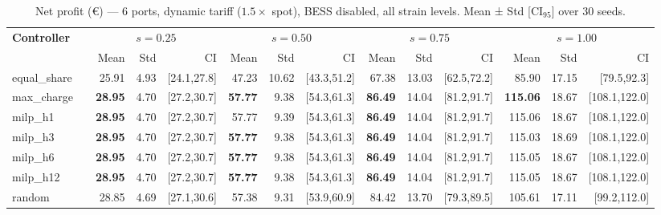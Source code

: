 \begin{table}[!htb]
\centering
\caption{Net profit (€) — 6 ports, dynamic tariff ($1.5\times$ spot),
         BESS disabled, all strain levels.
         Mean ± Std [CI$_{95}$] over 30 seeds.}
\label{tab:gc_dyn_nobess_6p}
\setlength{\tabcolsep}{3pt}
\begin{tabular}{lp{0.6cm} rrr rrr rrr rrr}
\toprule
\textbf{Controller} & &
  \multicolumn{3}{c}{$s=0.25$} &
  \multicolumn{3}{c}{$s=0.50$} &
  \multicolumn{3}{c}{$s=0.75$} &
  \multicolumn{3}{c}{$s=1.00$} \\
\cmidrule(lr){3-5}\cmidrule(lr){6-8}\cmidrule(lr){9-11}\cmidrule(lr){12-14}
 & & Mean & Std & CI & Mean & Std & CI & Mean & Std & CI & Mean & Std & CI \\
\midrule
equal\_share & & 25.91 &  4.93 & [24.1,27.8] & 47.23 & 10.62 & [43.3,51.2] & 67.38 & 13.03 & [62.5,72.2] &  85.90 & 17.15 & [79.5,92.3] \\
max\_charge  & & \textbf{28.95} &  4.70 & [27.2,30.7] & \textbf{57.77} &  9.38 & [54.3,61.3] & \textbf{86.49} & 14.04 & [81.2,91.7] & \textbf{115.06} & 18.67 & [108.1,122.0] \\
milp\_h1     & & \textbf{28.95} &  4.70 & [27.2,30.7] & 57.77 &  9.39 & [54.3,61.3] & \textbf{86.49} & 14.04 & [81.2,91.7] & 115.06 & 18.67 & [108.1,122.0] \\
milp\_h3     & & \textbf{28.95} &  4.70 & [27.2,30.7] & \textbf{57.77} &  9.38 & [54.3,61.3] & \textbf{86.49} & 14.04 & [81.2,91.7] & 115.03 & 18.69 & [108.1,122.0] \\
milp\_h6     & & \textbf{28.95} &  4.70 & [27.2,30.7] & \textbf{57.77} &  9.38 & [54.3,61.3] & \textbf{86.49} & 14.04 & [81.2,91.7] & 115.05 & 18.67 & [108.1,122.0] \\
milp\_h12    & & \textbf{28.95} &  4.70 & [27.2,30.7] & \textbf{57.77} &  9.38 & [54.3,61.3] & \textbf{86.49} & 14.04 & [81.2,91.7] & 115.05 & 18.67 & [108.1,122.0] \\
random       & & 28.85 &  4.69 & [27.1,30.6] & 57.38 &  9.31 & [53.9,60.9] & 84.42 & 13.70 & [79.3,89.5] & 105.61 & 17.11 & [99.2,112.0] \\
\bottomrule
\end{tabular}
\end{table}

